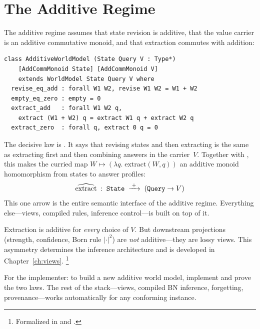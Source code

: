 \documentclass[11pt,openany]{report}
\begin{document}
\section{The Additive Regime}
\label{sec:additive-regime}

The additive regime assumes that state revision is additive, that the
value carrier is an additive commutative monoid, and that extraction
commutes with addition:

\begin{lstlisting}[language={}]
class AdditiveWorldModel (State Query V : Type*)
    [AddCommMonoid State] [AddCommMonoid V]
    extends WorldModel State Query V where
  revise_eq_add : forall W1 W2, revise W1 W2 = W1 + W2
  empty_eq_zero : empty = 0
  extract_add   : forall W1 W2 q,
    extract (W1 + W2) q = extract W1 q + extract W2 q
  extract_zero  : forall q, extract 0 q = 0
\end{lstlisting}

\noindent
The decisive law is .  It says that revising states
and then extracting is the same as extracting first and then combining
answers in the carrier~$V$.  Together with , this
makes the curried map
$W \mapsto (\lambda q.\; \mathrm{extract}(W, q))$ an additive monoid
homomorphism from states to answer profiles:
\[
  \widehat{\mathrm{extract}} \;:\;
  \texttt{State} \;\xrightarrow{\;+\;}\;
  (\texttt{Query} \to V)
\]
This one arrow is the entire semantic interface of the additive regime.
Everything else---views, compiled rules, inference control---is built
on top of it.

Extraction is additive for \emph{every} choice of $V$.  But downstream
projections (strength, confidence, Born rule $|\cdot|^2$) are
\emph{not} additive---they are lossy views.%
This asymmetry determines
the inference architecture and is developed in
Chapter~\ref{ch:views}.%
\footnote{Formalized in
and .}

For the implementer: to build a new additive world model, implement
 and prove the two laws.  The rest of the stack---views,
compiled BN inference, forgetting, provenance---works automatically for
any conforming instance.
\end{document}
